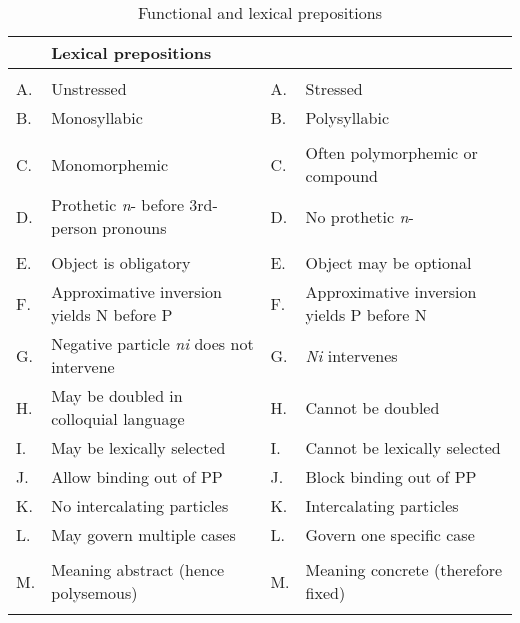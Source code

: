 \documentclass[output=paper,colorlinks,citecolor=brown,newtxmath]{langsci/langscibook}
\begin{document}
\begin{table}
  \centering
  \caption{Functional and lexical prepositions \citep[70]{YadroffFranks2001}}
    \begin{tabularx}{\textwidth}{p{1em}p{13em}p{1em}p{13em}}\lsptoprule
    \multicolumn{2}{p{15em}}{Functional prepositions } & \multicolumn{2}{p{15em}}{Lexical prepositions} \\\midrule\addlinespace
    \multicolumn{2}{p{14em}}{\textit{Phonology}} & \multicolumn{1}{r}{} & \multicolumn{1}{r}{} \\
    A.    & Unstressed  & A.    & Stressed \\
    B.    & Monosyllabic & B.    & Polysyllabic \\\addlinespace
    \multicolumn{2}{p{14em}}{\textit{Morphology}} & \multicolumn{1}{r}{} & \multicolumn{1}{r}{} \\
    C.    & Monomorphemic & C.    & Often polymorphemic or compound \\
    D.    & Prothetic \textit{n}- before 3rd-person pronouns & D.    & No prothetic \textit{n}- \\\addlinespace
    \multicolumn{2}{p{14em}}{\textit{Syntax}} & \multicolumn{1}{r}{} & \multicolumn{1}{r}{} \\
    E.    & Object is obligatory & E.    & Object may be optional \\
    F.    & Approximative inversion yields N before P  & F.    & Approximative inversion yields P before N \\
    G.    & Negative particle \textit{ni} does not intervene & G.    & \textit{Ni} intervenes \\
    H.    & May be doubled in colloquial language & H.    & Cannot be doubled \\
    I.    & May be lexically selected & I.    & Cannot be lexically selected \\
    J.    & Allow binding out of PP & J.    & Block binding out of PP \\
    K.    & No intercalating particles & K.    & Intercalating particles \\
    L.    & May govern multiple cases & L.    & Govern one specific case \\\addlinespace
    \multicolumn{2}{p{14em}}{\textit{Semantics}} & \multicolumn{1}{r}{} & \multicolumn{1}{r}{} \\
    M.    & Meaning abstract (hence polysemous) & M.    & Meaning concrete (therefore fixed) \\\lspbottomrule
    \end{tabularx}
  \label{FCP}
\end{table}
\end{document}
